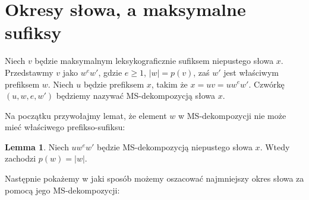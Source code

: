 \documentclass[a4paper,11pt]{article}
\theoremstyle{definition}
\newtheorem{lemma}{Lemma}[section]
\begin{document}
\section{Okresy słowa, a maksymalne sufiksy}
Niech $v$ będzie maksymalnym leksykograficznie sufiksem niepustego słowa $x$. Przedstawmy $v$ jako $w^ew'$, gdzie $e \geq 1$, $|w| = p(v)$, zaś $w'$ jest właściwym prefiksem $w$. Niech $u$ będzie prefiksem $x$, takim że $x = uv = uw^ew'$. Czwórkę $(u, w, e, w')$ będziemy nazywać MS-dekompozycją słowa $x$.
\par
Na początku przywołajmy lemat, że element $w$ w MS-dekompozycji nie może mieć właściwego prefikso-sufiksu:
\begin{lemma}\label{lem:w_is_borderless}
Niech $uw^ew'$ będzie MS-dekompozycją niepustego słowa $x$. Wtedy zachodzi $p(w) = |w|$.
\end{lemma}
\par
Następnie pokażemy w jaki sposób możemy oszacować najmniejszy okres słowa za pomocą jego MS-dekompozycji:
\end{document}

